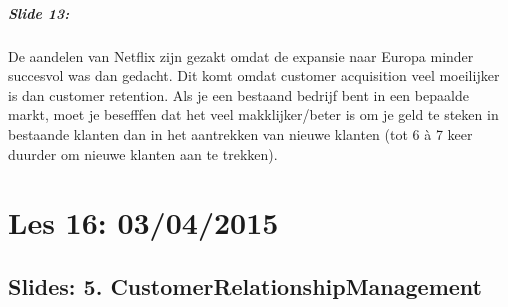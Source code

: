 \documentclass[10pt,a4paper]{report}
\begin{document}
\paragraph{Slide 13:}De aandelen van Netflix zijn gezakt omdat de expansie naar Europa minder succesvol was dan gedacht. Dit komt omdat customer acquisition veel moeilijker is dan customer retention. Als je een bestaand bedrijf bent in een bepaalde markt, moet je besefffen dat het veel makklijker/beter is om je geld te steken in bestaande klanten dan in het aantrekken van nieuwe klanten (tot 6 \`a 7 keer duurder om nieuwe klanten aan te trekken). 

\chapter{Les 16: 03/04/2015}
\section{Slides: 5. CustomerRelationshipManagement}
\end{document}
